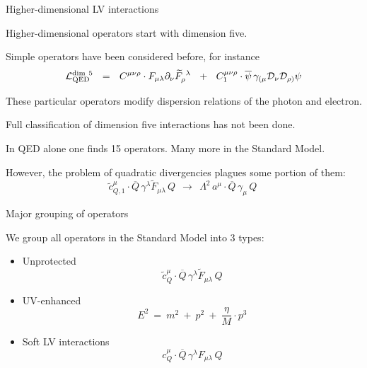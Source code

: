 \documentclass[pdf,UofT06talk,slideColor,colorBG,accumulate]{prosper}
\newcommand{\p}{\partial}
\newcommand{\mc}[1]{\mathcal{#1}}
\newcommand{\wt}{\widetilde}
\newcommand{\ov}{\overline}
\begin{document}
\begin{slide}{Higher-dimensional LV interactions}

	Higher-dimensional operators start with dimension {\mybf five}.

	Simple operators have been considered before, for instance
\[
	\mc{L}^{\rm dim~5}_{\rm QED} ~~=~~ 	
		C^{\mu\nu\rho}\cdot F_{\mu\lambda} \p_\nu \wt{F}_\rho^{~\lambda}
		~~+~~
		C_1^{\mu\nu\rho}\cdot \ov{\psi}\, \gamma_{(\mu} 
		\mathcal{D}_\nu \mathcal{D}_{\rho)} \psi 
\]

	These particular operators modify dispersion relations of the photon and electron.
	
	Full classification of dimension five interactions has not been done.

	In QED alone one finds 15 operators. Many more in the Standard Model.

	However, the problem of quadratic divergencies plagues some portion of them:
\[
		\wt{c}_{Q,1}^\mu \cdot
	\ov{Q}\, \gamma^\lambda \wt{F}_{\mu\lambda}\, Q 
	~~\longrightarrow~~
	\Lambda^2 \, a^\mu \cdot \ov{Q}\, \gamma_\mu\, Q~
\]

\end{slide}


\begin{slide}{Major grouping of operators}

	We group all operators in the Standard Model into 3 types:

\vspace{0.5cm}
\begin{itemize}
\item	{\myit Unprotected}
\[
		\wt{c}_{Q}^\mu \cdot
	\ov{Q}\, \gamma^\lambda \wt{F}_{\mu\lambda}\, Q 
\]

\item	{\myit UV-enhanced}
\[
	E^2 ~=~ m^2 ~+~ p^2 ~+~ \frac{\eta}{M} \cdot p^3 
\]

\item	{\myit Soft LV interactions}
\[
	c_{Q}^\mu \cdot
	\ov{Q}\, \gamma^\lambda F_{\mu\lambda}\, Q
\]

\end{itemize}

\end{slide}
\end{document}
